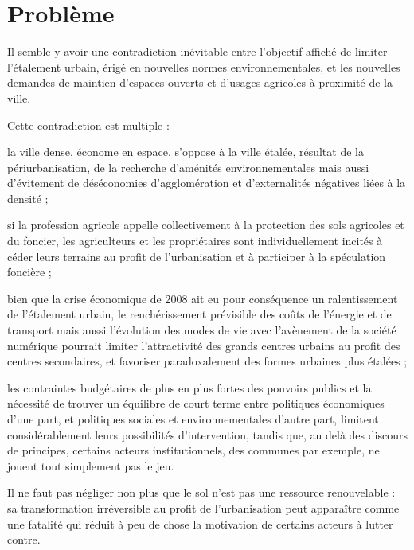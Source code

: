 \section[probleme]{Problème}

Il semble y avoir une contradiction inévitable entre l'objectif affiché de limiter
l'étalement urbain, érigé en nouvelles normes environnementales,
et les nouvelles demandes de maintien d'espaces ouverts
et d'usages agricoles à proximité de la ville.

Cette contradiction est multiple :

\startitemize[a]

\item la ville dense, économe en espace, s'oppose à la ville étalée,
	résultat de la périurbanisation, de la recherche d'aménités environnementales
	mais aussi d'évitement de déséconomies d'agglomération et d'externalités négatives
	liées à la densité ;

\item si la profession agricole appelle collectivement à la protection des sols agricoles
	et du foncier, les agriculteurs et les propriétaires sont individuellement
	incités à céder leurs terrains au profit de l'urbanisation et
	à participer à la spéculation foncière ;

\item bien que la crise économique de 2008 ait eu pour conséquence
	un ralentissement de l'étalement urbain,
	le renchérissement prévisible des coûts de l'énergie et de transport
	mais aussi l'évolution des modes de vie avec l'avènement de la société numérique
	pourrait limiter l'attractivité des grands centres urbains
	au profit des centres secondaires, et favoriser paradoxalement des formes urbaines
	plus étalées ;

\item les contraintes budgétaires de plus en plus fortes des pouvoirs publics
	et la nécessité de trouver un équilibre de court terme entre politiques économiques d'une part,
	et politiques sociales et environnementales d'autre part, limitent considérablement
	leurs possibilités d'intervention, tandis que, au delà des discours de principes,
	certains acteurs institutionnels, des communes par exemple,
	ne jouent tout simplement pas le jeu.

\stopitemize

Il ne faut pas négliger non plus que le sol n'est pas une ressource renouvelable :
sa transformation irréversible au profit de l'urbanisation peut apparaître comme une
fatalité qui réduit à peu de chose la motivation de certains acteurs à lutter contre.

